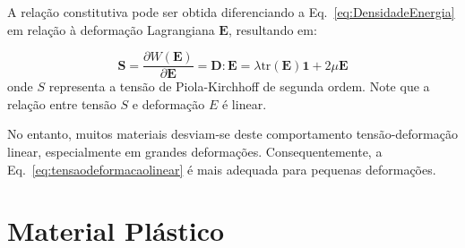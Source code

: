 A relação constitutiva pode ser obtida diferenciando a Eq.~\eqref{eq:DensidadeEnergia} em relação à deformação Lagrangiana $\mathbf{E}$, resultando em:

\begin{equation}\label{eq:tensaodeformacaolinear}
	\mathbf{S} = \frac{\partial W(\mathbf{E})}{\partial \mathbf{E}} = \mathbf{D} : \mathbf{E} = \lambda \text{tr}(\mathbf{E})\mathbf{1} + 2\mu \mathbf{E}
\end{equation}
onde $S$ representa a tensão de Piola-Kirchhoff de segunda ordem. Note que a relação entre tensão $S$ e deformação $E$ é linear. 

No entanto, muitos materiais desviam-se deste comportamento tensão-deformação linear, especialmente em grandes deformações. Consequentemente, a Eq.~\eqref{eq:tensaodeformacaolinear} é mais adequada para pequenas deformações.
\section{Material Plástico}